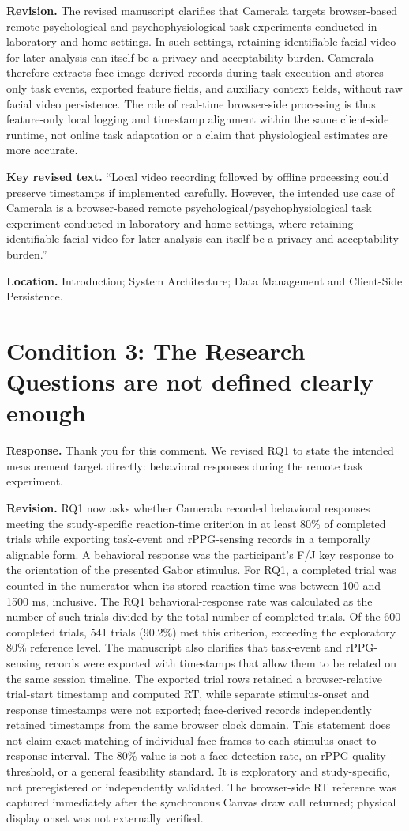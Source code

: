 \documentclass[11pt]{article}
\newcommand{\condition}[2]{\section*{Condition #1: #2}}
\begin{document}
\textbf{Revision.}
The revised manuscript clarifies that Camerala targets browser-based remote psychological and psychophysiological task experiments conducted in laboratory and home settings.
In such settings, retaining identifiable facial video for later analysis can itself be a privacy and acceptability burden.
Camerala therefore extracts face-image-derived records during task execution and stores only task events, exported feature fields, and auxiliary context fields, without raw facial video persistence.
The role of real-time browser-side processing is thus feature-only local logging and timestamp alignment within the same client-side runtime, not online task adaptation or a claim that physiological estimates are more accurate.

\textbf{Key revised text.}
``Local video recording followed by offline processing could preserve timestamps if implemented carefully. However, the intended use case of Camerala is a browser-based remote psychological/psychophysiological task experiment conducted in laboratory and home settings, where retaining identifiable facial video for later analysis can itself be a privacy and acceptability burden.''

\textbf{Location.}
Introduction; System Architecture; Data Management and Client-Side Persistence.

\condition{3}{The Research Questions are not defined clearly enough}
\textbf{Response.}
Thank you for this comment.
We revised RQ1 to state the intended measurement target directly: behavioral responses during the remote task experiment.

\textbf{Revision.}
RQ1 now asks whether Camerala recorded behavioral responses meeting the study-specific reaction-time criterion in at least 80\% of completed trials while exporting task-event and rPPG-sensing records in a temporally alignable form.
A behavioral response was the participant's F/J key response to the orientation of the presented Gabor stimulus.
For RQ1, a completed trial was counted in the numerator when its stored reaction time was between 100 and 1500 ms, inclusive.
The RQ1 behavioral-response rate was calculated as the number of such trials divided by the total number of completed trials.
Of the 600 completed trials, 541 trials (90.2\%) met this criterion, exceeding the exploratory 80\% reference level.
The manuscript also clarifies that task-event and rPPG-sensing records were exported with timestamps that allow them to be related on the same session timeline.
The exported trial rows retained a browser-relative trial-start timestamp and computed RT, while separate stimulus-onset and response timestamps were not exported; face-derived records independently retained timestamps from the same browser clock domain.
This statement does not claim exact matching of individual face frames to each stimulus-onset-to-response interval.
The 80\% value is not a face-detection rate, an rPPG-quality threshold, or a general feasibility standard.
It is exploratory and study-specific, not preregistered or independently validated.
The browser-side RT reference was captured immediately after the synchronous Canvas draw call returned; physical display onset was not externally verified.
\end{document}
